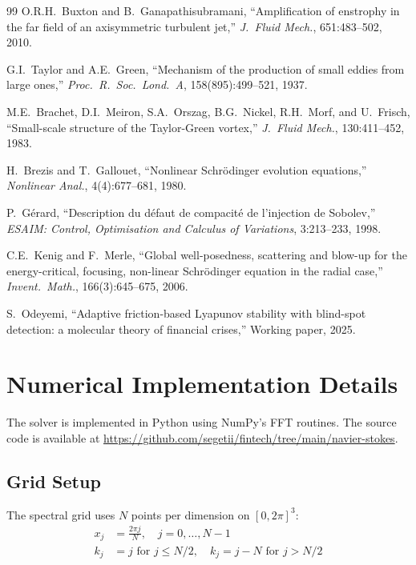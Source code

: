 \documentclass[12pt, a4paper]{article}
\begin{document}
\begin{thebibliography}{99}
O.R.H.~Buxton and B.~Ganapathisubramani,
``Amplification of enstrophy in the far field of an axisymmetric
turbulent jet,''
\emph{J.\ Fluid Mech.}, 651:483--502, 2010.

G.I.~Taylor and A.E.~Green,
``Mechanism of the production of small eddies from large ones,''
\emph{Proc.\ R.\ Soc.\ Lond.\ A}, 158(895):499--521, 1937.

M.E.~Brachet, D.I.~Meiron, S.A.~Orszag, B.G.~Nickel, R.H.~Morf,
and U.~Frisch,
``Small-scale structure of the Taylor-Green vortex,''
\emph{J.\ Fluid Mech.}, 130:411--452, 1983.

H.~Brezis and T.~Gallouet,
``Nonlinear Schr\"{o}dinger evolution equations,''
\emph{Nonlinear Anal.}, 4(4):677--681, 1980.

P.~G\'{e}rard,
``Description du d\'{e}faut de compacit\'{e} de
l'injection de Sobolev,''
\emph{ESAIM: Control, Optimisation and Calculus of Variations},
3:213--233, 1998.

C.E.~Kenig and F.~Merle,
``Global well-posedness, scattering and blow-up for the
energy-critical, focusing, non-linear Schr\"{o}dinger equation
in the radial case,''
\emph{Invent.\ Math.}, 166(3):645--675, 2006.

S.~Odeyemi,
``Adaptive friction-based Lyapunov stability with
blind-spot detection: a molecular theory of financial crises,''
Working paper, 2025.

\end{thebibliography}


\appendix

\section{Numerical Implementation Details}\label{app:implementation}

The solver is implemented in Python using NumPy's FFT routines.
The source code is available at
\url{https://github.com/segetii/fintech/tree/main/navier-stokes}.

\subsection{Grid Setup}

The spectral grid uses $N$ points per dimension on $[0, 2\pi]^3$:
\begin{align}
x_j &= \frac{2\pi j}{N}, \quad j = 0, \ldots, N-1 \\
k_j &= j \text{ for } j \leq N/2, \quad k_j = j - N \text{ for } j > N/2
\end{align}
\end{document}
